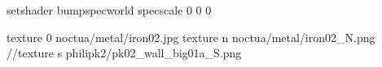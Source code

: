 setshader bumpspecworld
specscale 0 0 0

texture 0 noctua/metal/iron02.jpg
texture n noctua/metal/iron02_N.png
//texture s philipk2/pk02_wall_big01a_S.png
